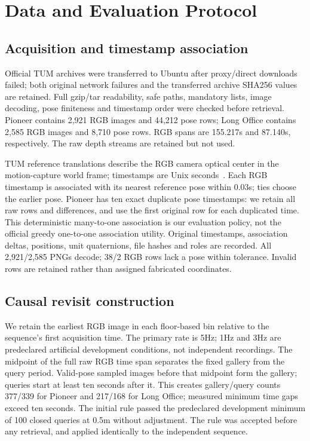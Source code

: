 \documentclass[conference,letterpaper]{IEEEtran}
\begin{document}
\section{Data and Evaluation Protocol}
\subsection{Acquisition and timestamp association}
Official TUM archives were transferred to Ubuntu after proxy/direct downloads failed; both original network failures and the transferred archive SHA256 values are retained. Full gzip/tar readability, safe paths, mandatory lists, image decoding, pose finiteness and timestamp order were checked before retrieval. Pioneer contains 2,921 RGB images and 44,212 pose rows; Long Office contains 2,585 RGB images and 8,710 pose rows. RGB spans are 155.217s and 87.140s, respectively. The raw depth streams are retained but not used.

TUM reference translations describe the RGB camera optical center in the motion-capture world frame; timestamps are Unix seconds~\cite{tumformat}. Each RGB timestamp is associated with its nearest reference pose within 0.03s; ties choose the earlier pose. Pioneer has ten exact duplicate pose timestamps: we retain all raw rows and differences, and use the first original row for each duplicated time. This deterministic many-to-one association is our evaluation policy, not the official greedy one-to-one association utility. Original timestamps, association deltas, positions, unit quaternions, file hashes and roles are recorded. All 2,921/2,585 PNGs decode; 38/2 RGB rows lack a pose within tolerance. Invalid rows are retained rather than assigned fabricated coordinates.

\subsection{Causal revisit construction}
We retain the earliest RGB image in each floor-based bin relative to the sequence's first acquisition time. The primary rate is 5Hz; 1Hz and 3Hz are predeclared artificial development conditions, not independent recordings. The midpoint of the full raw RGB time span separates the fixed gallery from the query period. Valid-pose sampled images before that midpoint form the gallery; queries start at least ten seconds after it. This creates gallery/query counts 377/339 for Pioneer and 217/168 for Long Office; measured minimum time gaps exceed ten seconds. The initial rule passed the predeclared development minimum of 100 closed queries at 0.5m without adjustment. The rule was accepted before any retrieval, and applied identically to the independent sequence.
\end{document}
